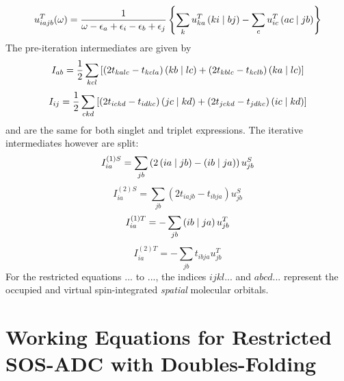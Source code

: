 \begin{equation}
u^T_{iajb}(\omega) = \frac{1}{\omega - \epsilon_a + \epsilon_i - \epsilon_b + \epsilon_j} \left\lbrace \sum_k u^T_{ka} \left( ki \mid bj \right) - \sum_c u^T_{ic} \left( ac \mid jb \right) \right\rbrace
\end{equation}
\noindent The pre-iteration intermediates are given by
\begin{equation}
I_{ab} = \frac{1}{2} \sum_{kcl} \left[ \left( 2t_{kalc} - t_{kcla}\right) \left( kb \mid lc \right) + \left( 2t_{kblc} - t_{kclb} \right) \left( ka \mid lc \right) \right]
\end{equation}
\begin{equation}
I_{ij} = \frac{1}{2} \sum_{ckd} \left[ \left( 2t_{ickd} - t_{idkc}\right) \left( jc \mid kd \right) + \left( 2t_{jckd} - t_{jdkc} \right) \left( ic \mid kd \right) \right]
\end{equation}
\noindent and are the same for both singlet and triplet expressions. The iterative intermediates however are split:
\begin{equation}
I^{(1)S}_{ia} = \sum_{jb} \left( 2\left( ia \mid jb \right) - \left( ib \mid ja \right) \right) u_{jb}^S
\end{equation}
\begin{equation}
I^{(2)S}_{ia} = \sum_{jb} \left( 2t_{iajb} - t_{ibja}\right) u_{jb}^S
\end{equation}
\begin{equation}
I^{(1)T}_{ia} = - \sum_{jb} \left( ib \mid ja \right) u_{jb}^T
\end{equation}
\begin{equation}
I^{(2)T}_{ia} = - \sum_{jb} t_{ibja} u_{jb}^T
\end{equation}
\noindent For the restricted equations ... to ..., the indices $ijkl...$ and $abcd...$  represent the occupied and virtual spin-integrated \emph{spatial} molecular orbitals. 

\section{Working Equations for Restricted SOS-ADC with Doubles-Folding}

